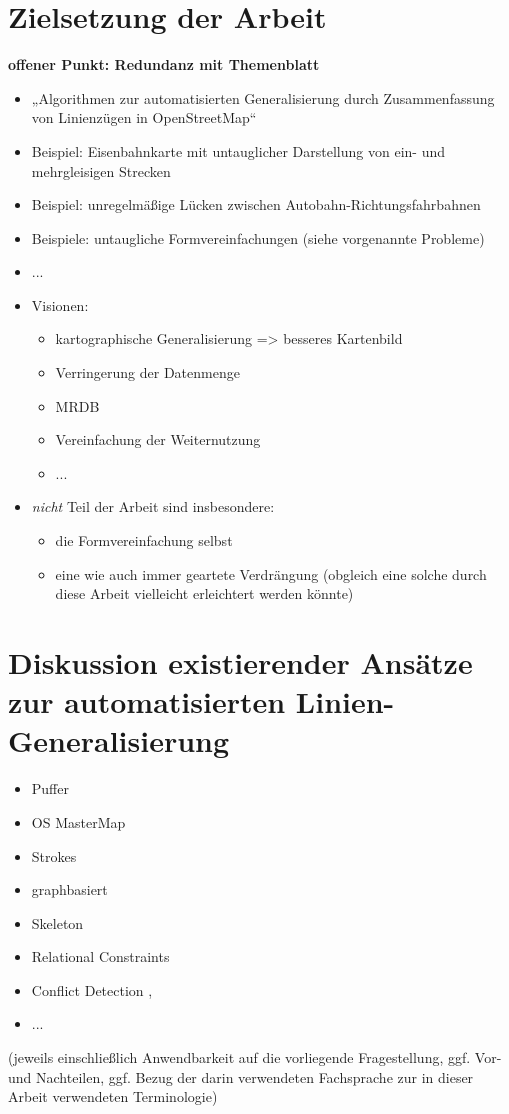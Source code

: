 \documentclass{../thesis}
\begin{document}
\section{Zielsetzung der Arbeit}

\textbf{offener Punkt: Redundanz mit Themenblatt}

\begin{itemize}
	\item „Algorithmen zur automatisierten Generalisierung durch Zusammenfassung von Linienzügen in OpenStreetMap“
	\item Beispiel: Eisenbahnkarte mit untauglicher Darstellung von ein- und mehrgleisigen Strecken
	\item Beispiel: unregelmäßige Lücken zwischen Autobahn-Richtungsfahrbahnen
	\item Beispiele: untaugliche Formvereinfachungen (siehe vorgenannte Probleme)
	\item ...
	\item Visionen:
	\begin{itemize}
		\item kartographische Generalisierung => besseres Kartenbild
		\item Verringerung der Datenmenge
		\item MRDB
		\item Vereinfachung der Weiternutzung
		\item ...
	\end{itemize}
	\item \emph{nicht} Teil der Arbeit sind insbesondere:
	\begin{itemize}
		\item die Formvereinfachung selbst
		\item eine wie auch immer geartete Verdrängung (obgleich eine solche durch diese Arbeit vielleicht erleichtert werden könnte)
	\end{itemize}
\end{itemize}


\section[Diskussion existierender Ansätze]{Diskussion existierender Ansätze zur automatisierten Linien-Generalisierung}

\begin{itemize}
	\item Puffer \cite{OHSZ10}
	\item OS MasterMap \cite{CM05}
	\item Strokes \cite{Tho06b, EM00}
	\item graphbasiert \cite{JC04, MM99, HAS05, TR95, Kne09}
	\item Skeleton\cite{LM96, Mig12, All11}
	\item Relational Constraints \cite{TBDJRG12}
	\item Conflict Detection \cite{KP98}, \cite{Tho06a}
	\item ...
\end{itemize}

(jeweils einschließlich Anwendbarkeit auf die vorliegende Fragestellung, ggf. Vor- und Nachteilen, ggf. Bezug der darin verwendeten Fachsprache zur in dieser Arbeit verwendeten Terminologie)


%
\end{document}
